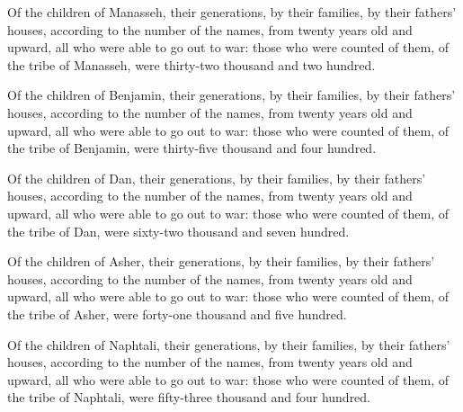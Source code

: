  Of the children of Manasseh, their generations, by their
families, by their fathers' houses, according to the number of the
names, from twenty years old and upward, all who were able to go out to
war:  those who were counted of them, of the tribe of
Manasseh, were thirty-two thousand and two hundred.

 Of the children of Benjamin, their generations, by their
families, by their fathers' houses, according to the number of the
names, from twenty years old and upward, all who were able to go out to
war:  those who were counted of them, of the tribe of
Benjamin, were thirty-five thousand and four hundred.

 Of the children of Dan, their generations, by their
families, by their fathers' houses, according to the number of the
names, from twenty years old and upward, all who were able to go out to
war:  those who were counted of them, of the tribe of Dan,
were sixty-two thousand and seven hundred.

 Of the children of Asher, their generations, by their
families, by their fathers' houses, according to the number of the
names, from twenty years old and upward, all who were able to go out to
war:  those who were counted of them, of the tribe of
Asher, were forty-one thousand and five hundred.

 Of the children of Naphtali, their generations, by their
families, by their fathers' houses, according to the number of the
names, from twenty years old and upward, all who were able to go out to
war:  those who were counted of them, of the tribe of
Naphtali, were fifty-three thousand and four hundred.

